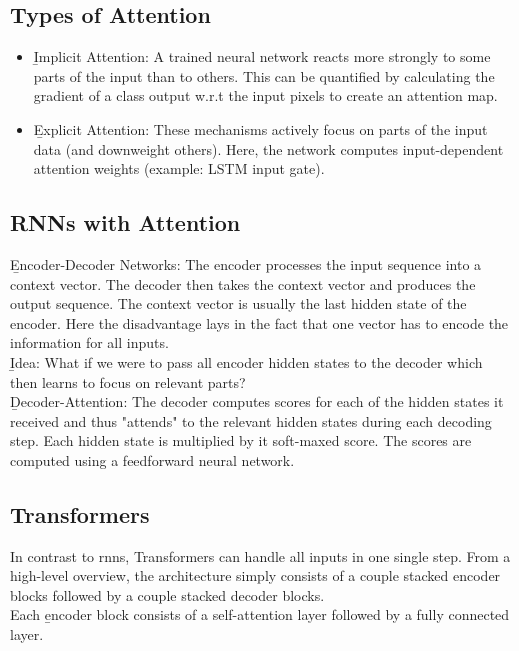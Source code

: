\subsection{Types of Attention}
\begin{itemize}
    \item \b{Implicit Attention:} A trained neural network reacts more strongly to some parts of the input than to others. This can be quantified by calculating the gradient of a class output w.r.t the input pixels to create an attention map.
    \item \b{Explicit Attention:} These mechanisms actively focus on parts of the input data (and downweight others). Here, the network computes input-dependent attention weights (example: LSTM input gate).
\end{itemize}

\subsection{RNNs with Attention}
\b{Encoder-Decoder Networks:} The encoder processes the input sequence into a context vector. The decoder then takes the context vector and produces the output sequence. The context vector is usually the last hidden state of the encoder. Here the disadvantage lays in the fact that one vector has to encode the information for all inputs.\\

\b{Idea:} What if we were to pass all encoder hidden states to the decoder which then learns to focus on relevant parts?\\

\b{Decoder-Attention:} The decoder computes scores for each of the hidden states it received and thus "attends" to the relevant hidden states during each decoding step. Each hidden state is multiplied by it soft-maxed score. The scores are computed using a feedforward neural network.

\subsection{Transformers}
In contrast to \acp{rnn}, Transformers can handle all inputs in one single step. From a high-level overview, the architecture simply consists of a couple stacked encoder blocks followed by a couple stacked decoder blocks.\\[0.1em]

Each \b{encoder block} consists of a self-attention layer followed by a fully connected layer.\\

